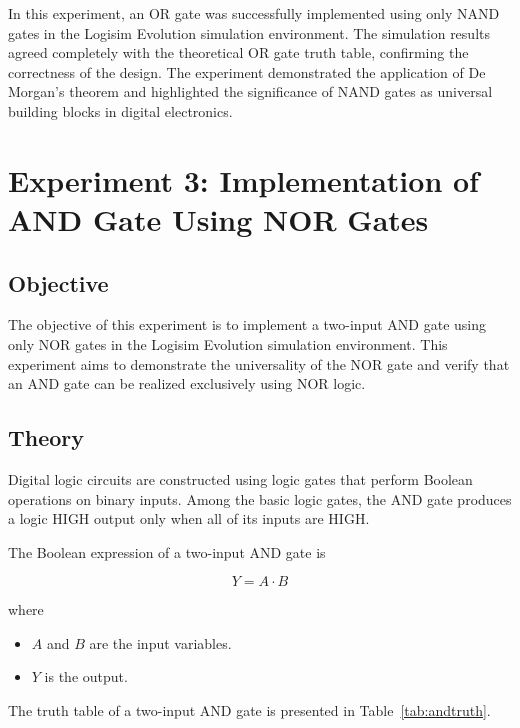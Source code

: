 \documentclass[12pt,a4paper]{article}
\begin{document}
In this experiment, an OR gate was successfully implemented using only NAND gates in the Logisim Evolution simulation environment. The simulation results agreed completely with the theoretical OR gate truth table, confirming the correctness of the design. The experiment demonstrated the application of De Morgan's theorem and highlighted the significance of NAND gates as universal building blocks in digital electronics.


\section{Experiment 3: Implementation of AND Gate Using NOR Gates}

\subsection{Objective}

The objective of this experiment is to implement a two-input AND gate using only NOR gates in the Logisim Evolution simulation environment. This experiment aims to demonstrate the universality of the NOR gate and verify that an AND gate can be realized exclusively using NOR logic.

\subsection{Theory}

Digital logic circuits are constructed using logic gates that perform Boolean operations on binary inputs. Among the basic logic gates, the AND gate produces a logic HIGH output only when all of its inputs are HIGH.

The Boolean expression of a two-input AND gate is

\begin{equation}
Y=A\cdot B
\end{equation}

where

\begin{itemize}
    \item $A$ and $B$ are the input variables.
    \item $Y$ is the output.
\end{itemize}

The truth table of a two-input AND gate is presented in Table~\ref{tab:andtruth}.
\end{document}
